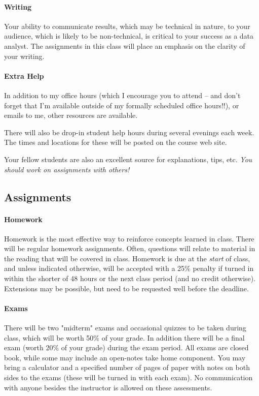 \documentclass[11pt]{article}
\begin{document}
\paragraph{Writing}
Your ability to communicate results, which may be technical in nature, to your audience, which is likely to be non-technical, is critical to your success as a data analyst. The assignments in this class will place an emphasis on the clarity of your writing. 

\paragraph{Extra Help}
In addition to my office hours (which I encourage you to attend -- and don't forget that I'm available outside of my formally scheduled office hours!!), or emails to me, other
resources are available.

There will also be drop-in student help hours during several evenings each week.  The times and locations for these will be posted on the course web site.

Your fellow students are also an excellent source for explanations, tips, etc.  \emph{You should work on assignments with others!}

\subsection*{Assignments}

\paragraph{Homework}
Homework is the most effective way to reinforce concepts learned in class. There will be regular homework assignments. Often, questions will relate to material in the reading that will be covered in class. Homework is due at the \emph{start} of class, and unless indicated otherwise, will be accepted with a 25\% penalty if turned in within the shorter of 48 hours or the next class period (and no credit otherwise).  Extensions may be possible, but need to be requested well before the deadline.

\paragraph{Exams}
There will be two "midterm" exams and occasional quizzes to be taken during class, which will be
worth 50\% of your grade.  In addition there will be a final exam (worth 20\% of your grade) during the exam period.  All exams are closed book, while some may include an open-notes take home component.  You may bring a calculator and a specified number of pages of paper with notes on both sides to the exams (these will be turned in with each exam).  No communication with anyone besides the instructor is allowed on these assessments.
\end{document}
